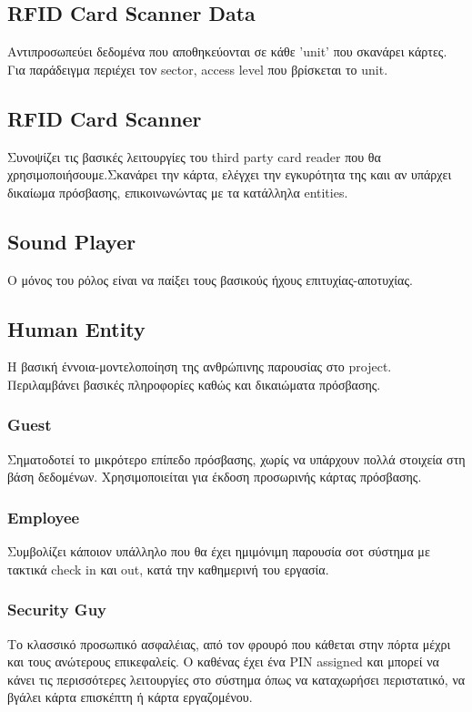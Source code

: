 \documentclass{article}
\begin{document}
\subsection{RFID Card Scanner Data}
Αντιπροσωπεύει δεδομένα που αποθηκεύονται σε κάθε 'unit' που σκανάρει κάρτες. Για παράδειγμα περιέχει τον sector, access level που βρίσκεται το unit.

\subsection{RFID Card Scanner}
Συνοψίζει τις βασικές λειτουργίες του third party card reader που θα χρησιμοποιήσουμε.Σκανάρει την κάρτα, ελέγχει την εγκυρότητα της καιι αν υπάρχει δικαίωμα πρόσβασης, επικοινωνώντας με τα κατάλληλα entities.

\subsection{Sound Player}
Ο μόνος του ρόλος είναι να παίξει τους βασικούς ήχους επιτυχίας-αποτυχίας.

\subsection{Human Entity}
Η βασική έννοια-μοντελοποίηση της ανθρώπινης παρουσίας στο project. Περιλαμβάνει βασικές πληροφορίες καθώς και δικαιώματα πρόσβασης.

\subsubsection{Guest}
Σηματοδοτεί το μικρότερο επίπεδο πρόσβασης, χωρίς να υπάρχουν πολλά στοιχεία στη βάση δεδομένων. Χρησιμοποιείται για έκδοση προσωρινής κάρτας πρόσβασης.

\subsubsection{Employee}
Συμβολίζει κάποιον υπάλληλο που θα έχει ημιμόνιμη παρουσία σοτ σύστημα με τακτικά check in και out, κατά την καθημερινή του εργασία.

\subsubsection{Security Guy}
Το κλασσικό προσωπικό ασφαλέιας, από τον φρουρό που κάθεται στην πόρτα μέχρι και τους ανώτερους επικεφαλείς. Ο καθένας έχει ένα PIN assigned και μπορεί να κάνει τις περισσότερες λειτουργίες στο σύστημα όπως να καταχωρήσει περιστατικό, να βγάλει κάρτα επισκέπτη ή κάρτα εργαζομένου.
\end{document}

